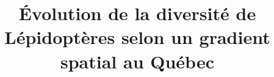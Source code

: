 \documentclass[conference,final,]{IEEEtran}
\begin{document}
%
\title{Évolution de la diversité de Lépidoptères selon un gradient
spatial au Québec}


\author{











}


%
\end{document}
